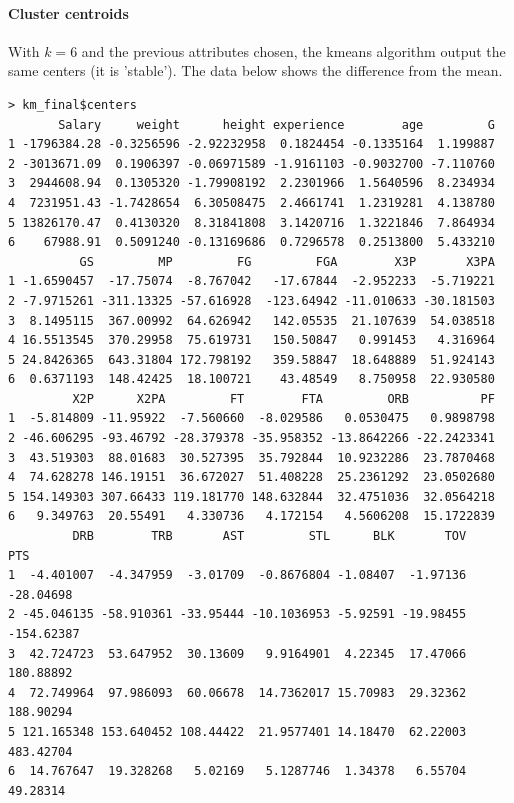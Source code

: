 \paragraph{Cluster centroids}With $k=6$ and the previous attributes chosen, the kmeans algorithm output the same centers (it is 'stable'). The data below shows the difference from the mean.

\begin{verbatim}
> km_final$centers
       Salary     weight      height experience        age         G
1 -1796384.28 -0.3256596 -2.92232958  0.1824454 -0.1335164  1.199887
2 -3013671.09  0.1906397 -0.06971589 -1.9161103 -0.9032700 -7.110760
3  2944608.94  0.1305320 -1.79908192  2.2301966  1.5640596  8.234934  
4  7231951.43 -1.7428654  6.30508475  2.4661741  1.2319281  4.138780 
5 13826170.47  0.4130320  8.31841808  3.1420716  1.3221846  7.864934 
6    67988.91  0.5091240 -0.13169686  0.7296578  0.2513800  5.433210  
          GS         MP         FG         FGA        X3P       X3PA
1 -1.6590457  -17.75074  -8.767042   -17.67844  -2.952233  -5.719221
2 -7.9715261 -311.13325 -57.616928  -123.64942 -11.010633 -30.181503
3  8.1495115  367.00992  64.626942   142.05535  21.107639  54.038518
4 16.5513545  370.29958  75.619731   150.50847   0.991453   4.316964
5 24.8426365  643.31804 172.798192   359.58847  18.648889  51.924143
6  0.6371193  148.42425  18.100721    43.48549   8.750958  22.930580
         X2P      X2PA         FT        FTA         ORB          PF
1  -5.814809 -11.95922  -7.560660  -8.029586   0.0530475   0.9898798
2 -46.606295 -93.46792 -28.379378 -35.958352 -13.8642266 -22.2423341
3  43.519303  88.01683  30.527395  35.792844  10.9232286  23.7870468
4  74.628278 146.19151  36.672027  51.408228  25.2361292  23.0502680
5 154.149303 307.66433 119.181770 148.632844  32.4751036  32.0564218
6   9.349763  20.55491   4.330736   4.172154   4.5606208  15.1722839
         DRB        TRB       AST         STL      BLK       TOV        PTS
1  -4.401007  -4.347959  -3.01709  -0.8676804 -1.08407  -1.97136  -28.04698
2 -45.046135 -58.910361 -33.95444 -10.1036953 -5.92591 -19.98455 -154.62387
3  42.724723  53.647952  30.13609   9.9164901  4.22345  17.47066  180.88892
4  72.749964  97.986093  60.06678  14.7362017 15.70983  29.32362  188.90294
5 121.165348 153.640452 108.44422  21.9577401 14.18470  62.22003  483.42704
6  14.767647  19.328268   5.02169   5.1287746  1.34378   6.55704   49.28314
\end{verbatim}

